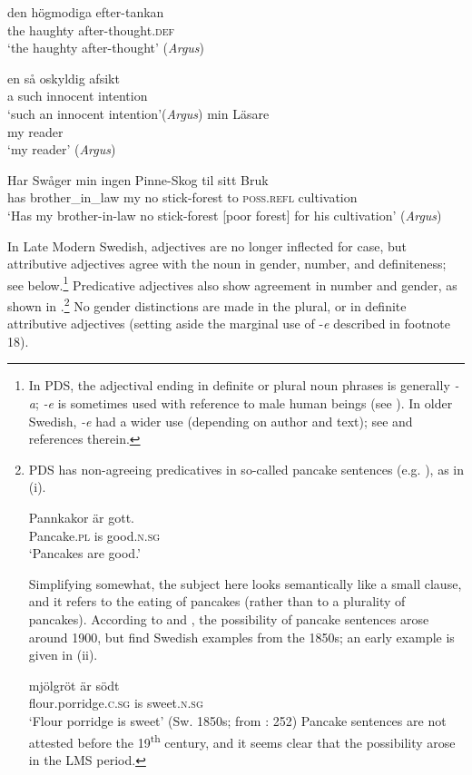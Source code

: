 \documentclass[output=paper]{langscibook}
\begin{document}
\ea \label{ex:intro:33}
\ea \label{ex:intro:33a}
\gll  den högmodiga     efter-tankan \\
the  haughty   after-thought\textsc{.def}\\
\glt ‘the haughty after-thought’ (\textit{Argus})

\ex \label{ex:intro:33b}
\gll en så     oskyldig   afsikt\\
    a   such  innocent   intention\\
\glt `such an innocent intention’(\textit{Argus})
\z
\ex \label{ex:intro:34}
\ea \label{ex:intro:34a}
\gll  min Läsare \\
my   reader \\
\glt        ‘my reader’ (\textit{Argus})

\ex \label{ex:intro:34b}
\gll Har Swåger       min   ingen Pinne-Skog   til sitt       Bruk\\
 has  brother\_in\_law  my  no    stick-forest    to  \textsc{poss.refl}  cultivation\\
\glt        ‘Has my brother-in-law no stick-forest [poor forest] for his cultivation’ (\textit{Argus})
\z
\z

In Late Modern Swedish, adjectives are no longer inflected for case, but attributive adjectives agree with the noun in gender, number, and definiteness; see  below.\footnote{In PDS, the adjectival ending in definite or plural noun phrases is generally \textit{{}-a}; \textit{{}-e} is sometimes used with reference to male human beings (see \citealt{Bylin2016}). In older Swedish, \textit{{}-e} had a wider use (depending on author and text); see \citet{Larsson2004} and references therein.}  Predicative adjectives also show agreement in number and gender, as shown in .\footnote{PDS has non-agreeing predicatives in so-called pancake sentences (e.g. \citealt{Josefsson2009}), as in (i).

\ea
\gll  Pannkakor   är   gott. \\
Pancake\textsc{.pl}  is   good\textsc{.n.sg}\\
\glt ‘Pancakes are good.’
\z

Simplifying somewhat, the subject here looks semantically like a small clause, and it refers to the eating of pancakes (rather than to a plurality of pancakes). According to \citet{Faarlund1977} and \citet{Josefsson2014}, the possibility of pancake sentences arose around 1900, but \citet{HaugenEtAl2019} find Swedish examples from the 1850s; an early example is given in (ii).

\ea \gll mjölgröt     är södt\\
        flour.porridge\textsc{.c.sg}   is sweet\textsc{.n.sg}\\
        \glt ‘Flour porridge is sweet’ (Sw. 1850s; from \citealt{HaugenEtAl2019}: 252)
\z Pancake sentences are not attested before the 19\textsuperscript{th} century, and it seems clear that the possibility arose in the LMS period.} No gender distinctions are made in the plural, or in definite attributive adjectives (setting aside the marginal use of -\textit{e} described in footnote 18).
\end{document}
